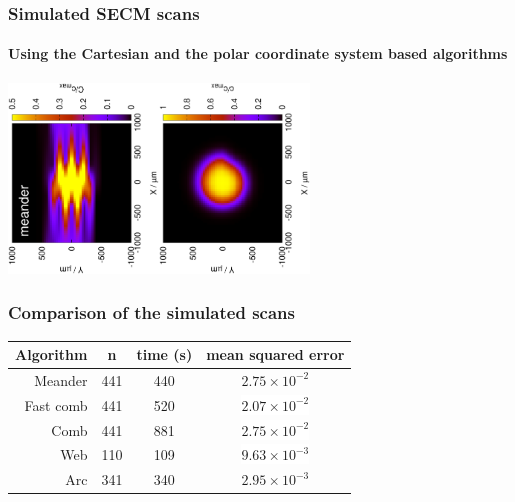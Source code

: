 \documentclass{beamer}
\begin{document}
\begin{frame}
	\frametitle{Simulated SECM scans}	
	\framesubtitle{Using the Cartesian and the polar coordinate system based algorithms}
	\centering
	\includegraphics[width=0.3\textwidth, angle=-90]{meander_sim.eps}\includegraphics[width=0.3\textwidth, angle=-90]{arc_sim.eps}
	\vfill
\end{frame}


\begin{frame}
	\frametitle{Comparison of the simulated scans}

\begin{table}
		\label{table:comp}
		\centering
		\begin{tabular}{r c c c}
			Algorithm & n & time (s) & mean squared error \\
			\hline
			Meander & 441 & 440 & \textcolor{white!100}{\colorbox{red!100}{$2.75\times 10^{-2}$}} \\
			Fast comb& 441 & 520  & \colorbox{white}{$2.07\times 10^{-2}$} \\
			Comb & 441 & 881 & \colorbox{white}{$2.75\times 10^{-2}$} \\
			Web & 110 & 109 & \colorbox{white}{$9.63\times 10^{-3}$} \\
			Arc & 341 & 340 & \colorbox{green!100}{$2.95\times 10^{-3}$} \\
		\end{tabular}
\end{table}
\end{frame}
\end{document}
